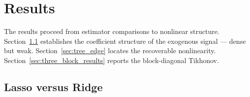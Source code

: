 \section{Results}
\label{sec:results}


The results proceed from estimator comparisons to
nonlinear structure.
Section~\ref{sec:dense_weak} establishes the coefficient structure of
the exogenous signal --- dense but weak.
Section~\ref{sec:tree_edge} locates the recoverable nonlinearity.
Section~\ref{sec:three_block_results} reports the block-diagonal Tikhonov.

\subsection{Lasso versus Ridge}
\label{sec:dense_weak}

